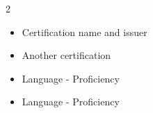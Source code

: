 \documentclass[10pt,a4paper,ragged2e,withhyper]{altacv}
\begin{document}
\begin{paracol}{2}
\begin{itemize}
\item Certification name and issuer
\item Another certification
\end{itemize}

\begin{itemize}[label={}]
    \item Language - Proficiency
    \item Language - Proficiency
\end{itemize}

\end{paracol}
\end{document}
